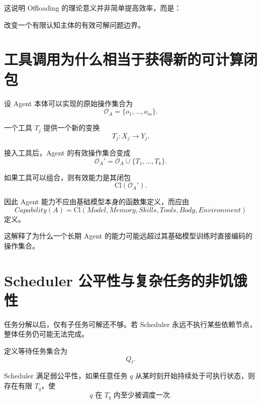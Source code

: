 这说明 Offloading 的理论意义并非简单提高效率，而是：

\begin{statementbox}
改变一个有限认知主体的有效可解问题边界。
\end{statementbox}

\section{工具调用为什么相当于获得新的可计算闭包}

设 Agent 本体可以实现的原始操作集合为
\begin{equation}
\mathcal O_A
=
\{o_1,\ldots,o_m\}.
\end{equation}

一个工具 $T_j$ 提供一个新的变换
\begin{equation}
T_j:
X_j
\rightarrow
Y_j.
\end{equation}

接入工具后，Agent 的有效操作集合变成
\begin{equation}
\mathcal O_A'
=
\mathcal O_A
\cup
\{T_1,\ldots,T_k\}.
\end{equation}

如果工具可以组合，则有效能力是其闭包
\begin{equation}
\mathrm{Cl}
\left(
\mathcal O_A'
\right).
\end{equation}

因此 Agent 能力不应由基础模型本身的函数集定义，而应由
\begin{equation}
\boxed{
Capability(A)
=
\mathrm{Cl}
\left(
Model,
Memory,
Skills,
Tools,
Body,
Environment
\right)
}
\end{equation}
定义。

这解释了为什么一个长期 Agent 的能力可能远超过其基础模型训练时直接编码的操作集合。

\section{Scheduler 公平性与复杂任务的非饥饿性}

任务分解以后，仅有子任务可解还不够。若 Scheduler 永远不执行某些依赖节点，整体任务仍可能无法完成。

定义等待任务集合为
\begin{equation}
Q_t.
\end{equation}

Scheduler 满足弱公平性，如果任意任务 $q$ 从某时刻开始持续处于可执行状态，则存在有限 $T_q$，使
\begin{equation}
q
\text{ 在 }
T_q
\text{ 内至少被调度一次}.
\end{equation}

